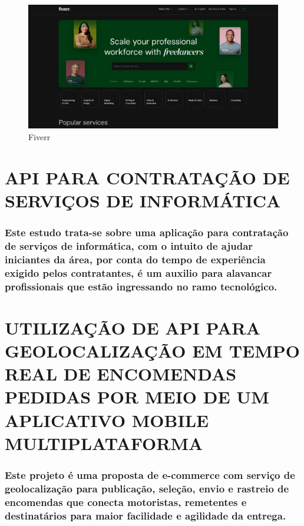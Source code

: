 \begin{figure}[h!]
\centering
\caption{Fiverr}
\label{fig:Fiverr}
\includegraphics[scale=0.4]{Illustrations/Fiverr.jpg}
\end{figure}

\section{API PARA CONTRATAÇÃO DE SERVIÇOS DE INFORMÁTICA}
\subsubsection{Este estudo \cite{Silva2022} trata-se sobre uma aplicação para contratação de serviços de informática, com o intuito de ajudar iniciantes da área, por conta do tempo de experiência exigido pelos contratantes, é um auxilio para alavancar profissionais que estão ingressando no ramo tecnológico.}

\section{UTILIZAÇÃO DE API PARA GEOLOCALIZAÇÃO EM TEMPO REAL DE ENCOMENDAS PEDIDAS POR MEIO DE UM APLICATIVO MOBILE MULTIPLATAFORMA}
\subsubsection{Este projeto \cite{Oliveira2022} é uma proposta de e-commerce com serviço de geolocalização para publicação, seleção, envio e rastreio de encomendas que conecta motoristas, remetentes e destinatários para maior facilidade e agilidade da entrega.}

